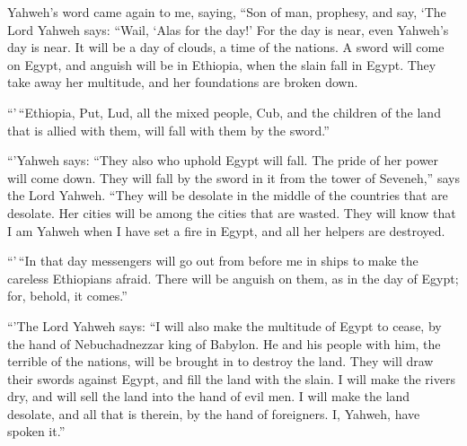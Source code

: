  Yahweh's word came again to me, saying, 
``Son of man, prophesy, and say, `The Lord Yahweh says: ``Wail, `Alas
for the day!'  For the day is near, even Yahweh's day is
near. It will be a day of clouds, a time of the nations. 
A sword will come on Egypt, and anguish will be in Ethiopia, when the
slain fall in Egypt. They take away her multitude, and her foundations
are broken down.

 ``'\,``Ethiopia, Put, Lud, all the mixed people, Cub, and
the children of the land that is allied with them, will fall with them
by the sword.''

 ``'Yahweh says: ``They also who uphold Egypt will fall.
The pride of her power will come down. They will fall by the sword in it
from the tower of Seveneh,'' says the Lord Yahweh.  ``They
will be desolate in the middle of the countries that are desolate. Her
cities will be among the cities that are wasted.  They
will know that I am Yahweh when I have set a fire in Egypt, and all her
helpers are destroyed.

 ``'\,``In that day messengers will go out from before me
in ships to make the careless Ethiopians afraid. There will be anguish
on them, as in the day of Egypt; for, behold, it comes.''

 ``'The Lord Yahweh says: ``I will also make the
multitude of Egypt to cease, by the hand of Nebuchadnezzar king of
Babylon.  He and his people with him, the terrible of the
nations, will be brought in to destroy the land. They will draw their
swords against Egypt, and fill the land with the slain. 
I will make the rivers dry, and will sell the land into the hand of evil
men. I will make the land desolate, and all that is therein, by the hand
of foreigners. I, Yahweh, have spoken it.''

